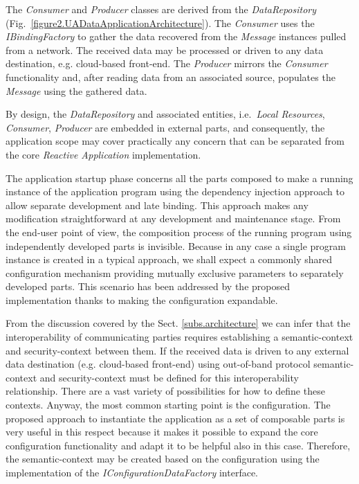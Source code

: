 \documentclass{jacsart}
\begin{document}
The \textit{Consumer} and \textit{Producer} classes are derived from the \textit{DataRepository} (Fig.~\ref*{figure2.UADataApplicationArchitecture}). The \textit{Consumer} uses the \textit{IBindingFactory} to gather the data recovered from the \emph{Message} instances pulled from a network. The received data may be processed or driven to any data destination, e.g. cloud-based front-end. The \textit{Producer} mirrors the \textit{Consumer} functionality and, after reading data from an associated source, populates the \emph{Message} using the gathered data.

By design, the \textit{DataRepository} and associated entities, i.e.~\textit{Local Resources}, \textit{Consumer}, \textit{Producer} are embedded in external parts, and consequently, the application scope may cover practically any concern that can be separated from the core \textit{Reactive Application} implementation.

The application startup phase concerns all the parts composed to make a running instance of the application program using the dependency injection approach to allow separate development and late binding. This approach makes any modification straightforward at any development and maintenance stage. From the end-user point of view, the composition process of the running program using independently developed parts is invisible. Because in any case a single program instance is created in a typical approach, we shall expect a commonly shared configuration mechanism providing mutually exclusive parameters to separately developed parts. This scenario has been addressed by the proposed implementation thanks to making the configuration expandable.

From the discussion covered by the Sect. \ref*{subs.architecture} we can infer that the interoperability of communicating parties requires establishing a semantic-context and security-context between them. If the received data is driven to any external data destination (e.g. cloud-based front-end) using out-of-band protocol semantic-context and security-context must be defined for this interoperability relationship. There are a vast variety of possibilities for how to define these contexts. Anyway, the most common starting point is the configuration. The proposed approach to instantiate the application as a set of composable parts is very useful in this respect because it makes it possible to expand the core configuration functionality and adapt it to be helpful also in this case. Therefore, the semantic-context may be created based on the configuration using the implementation of the \textit{IConfigurationDataFactory} interface.
\end{document}
